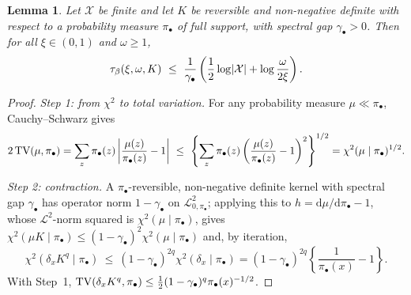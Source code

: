 \documentclass[aos]{imsart}%
\DeclarePairedDelimiter{\abs}{\lvert}{\rvert}
\newcommand{\TV}[0]{\textup{TV}}
\newcommand{\ambientspace}[0]{\mathcal{X}}
\newcommand{\dd}[0]{\mathrm{d}}
\newcommand{\calL}[0]{\mathcal{L}}
\theoremstyle{plain}
\newtheorem{lemma}[theorem]{Lemma}
\theoremstyle{definition}
\begin{document}
    \begin{lemma}
        \label{lemma:binary_taubeta}
        Let $\ambientspace$ be finite and let $K$ be reversible and
        non-negative definite with respect to a probability measure
        $\pi_\bullet$ of full support, with spectral gap $\gamma_\bullet>0$.
        Then for all $\xi\in(0,1)$ and $\omega\geq1$,
        \begin{equation}
            \label{eq:binary_taubeta}
            \tau_\beta(\xi,\omega,K)\ \leq\
            \frac{1}{\gamma_\bullet}\left(\frac12\log\abs{\ambientspace}
            +\log\frac{\omega}{2\xi}\right).
        \end{equation}
    \end{lemma}

    \begin{proof}
        \emph{Step 1: from $\chi^{2}$ to total variation.} For any probability
        measure $\mu\ll\pi_\bullet$, Cauchy--Schwarz gives
        \begin{equation*}
            2\,\TV(\mu,\pi_\bullet)
            =\sum_{z}\pi_\bullet(z)
            \left|\frac{\mu(z)}{\pi_\bullet(z)}-1\right|
            \ \leq\ \left\{\sum_z\pi_\bullet(z)
            \left(\frac{\mu(z)}{\pi_\bullet(z)}-1\right)^{2}\right\}^{1/2}
            =\chi^{2}(\mu\mid\pi_\bullet)^{1/2} .
        \end{equation*}

        \emph{Step 2: contraction.} A $\pi_\bullet$-reversible, non-negative
        definite kernel with spectral gap $\gamma_\bullet$ has operator norm
        $1-\gamma_\bullet$ on $\calL^{2}_{0,\pi_\bullet}$; applying this to
        $h=\dd\mu/\dd\pi_\bullet-1$, whose $\calL^{2}$-norm squared is
        $\chi^{2}(\mu\mid\pi_\bullet)$, gives
        $\chi^{2}(\mu K\mid\pi_\bullet)\leq(1-\gamma_\bullet)^{2}
        \chi^{2}(\mu\mid\pi_\bullet)$ and, by iteration,
        \begin{equation*}
            \chi^{2}(\delta_xK^{q}\mid\pi_\bullet)
            \ \leq\ (1-\gamma_\bullet)^{2q}
            \chi^{2}(\delta_x\mid\pi_\bullet)
            =(1-\gamma_\bullet)^{2q}
            \left\{\frac{1}{\pi_\bullet(x)}-1\right\}.
        \end{equation*}
        With Step~1, $\TV(\delta_xK^{q},\pi_\bullet)\leq
        \tfrac12(1-\gamma_\bullet)^{q}\pi_\bullet(x)^{-1/2}$.


\end{proof}
\end{document}

